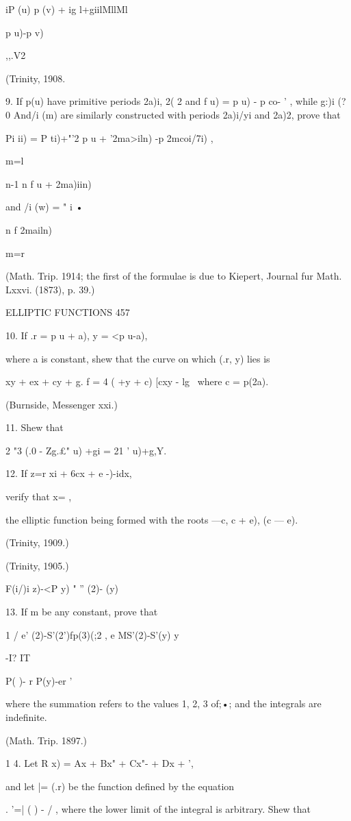 {iP (u) p (v) + ig l+giilMllMl

 p u)-p v)

,,.V2

(Trinity, 1908.

9. If p(u) have primitive periods 2a)i, 2( 2 and f u) = p u) - p co- '
, while g:)i (?0 And/i (m) are similarly constructed with periods
2a)i/yi and 2a)2, prove that

Pi ii) = P ti)+"'2 p u + '2ma>iln) -p 2mcoi/7i) ,

m=l

n-1 n f u + 2ma)iin)

 and /i (w) = " i •

n f 2mailn)

m=r

(Math. Trip. 1914; the first of the formulae is due to Kiepert,
Journal fur Math. Lxxvi. (1873), p. 39.)

ELLIPTIC FUNCTIONS 457

10. If .r = p u + a), y = <p u-a),

where a is constant, shew that the curve on which (.r, y) lies is

 xy + ex + cy + g. f = 4 ( +y + c) [cxy - lg \ where c = p(2a).

(Burnside, Messenger xxi.)

11. Shew that

2 "3 (.0 - Zg.£" u) +gi = 21 ' u)+g,Y.

12. If z=r xi + 6cx + e -)-idx,

verify that x= ,

the elliptic function being formed with the roots —c, c + e), (c — e).

(Trinity, 1909.)

(Trinity, 1905.)

F(i/)i z)-<P y) " '' (2)- (y)

13. If m be any constant, prove that

1 / e' (2)-S'(2')fp(3)(;2 , e MS'(2)-S'(y) y

-I? IT

 P( )- r P(y)-er '

where the summation refers to the values 1, 2, 3 of;•; and the
integrals are indefinite.

(Math. Trip. 1897.)

1 4. Let R x) = Ax + Bx" + Cx"- + Dx + ',

and let |= (.r) be the function defined by the equation

. '=| ( ) - / , where the lower limit of the integral is arbitrary.
Shew that

}
